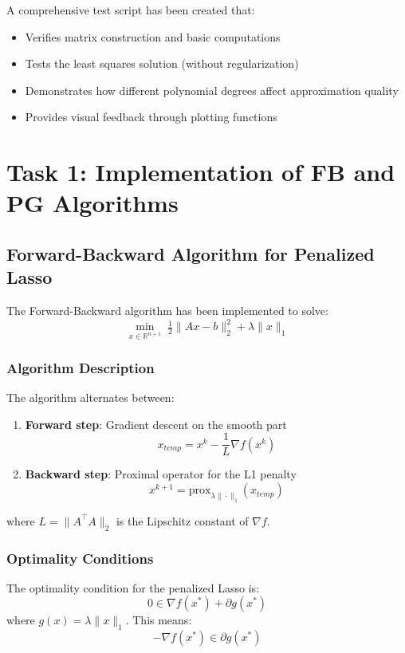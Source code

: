 \documentclass[11pt,a4paper]{article}
\begin{document}
A comprehensive test script has been created that:
\begin{itemize}
    \item Verifies matrix construction and basic computations
    \item Tests the least squares solution (without regularization)
    \item Demonstrates how different polynomial degrees affect approximation quality
    \item Provides visual feedback through plotting functions
\end{itemize}

\section{Task 1: Implementation of FB and PG Algorithms}

\subsection{Forward-Backward Algorithm for Penalized Lasso}

The Forward-Backward algorithm has been implemented to solve:
\begin{equation}
    \min_{x \in \mathbb{R}^{n+1}} \; \tfrac{1}{2}\|Ax - b\|_2^2 + \lambda \|x\|_1
\end{equation}

\subsubsection{Algorithm Description}

The algorithm alternates between:
\begin{enumerate}
    \item \textbf{Forward step}: Gradient descent on the smooth part
        \[ x_{temp} = x^k - \frac{1}{L}\nabla f(x^k) \]
    \item \textbf{Backward step}: Proximal operator for the L1 penalty
        \[ x^{k+1} = \text{prox}_{\lambda\|\cdot\|_1}(x_{temp}) \]
\end{enumerate}

where $L = \|A^\top A\|_2$ is the Lipschitz constant of $\nabla f$.

\subsubsection{Optimality Conditions}

The optimality condition for the penalized Lasso is:
\[ 0 \in \nabla f(x^*) + \partial g(x^*) \]
where $g(x) = \lambda\|x\|_1$. This means:
\[ -\nabla f(x^*) \in \partial g(x^*) \]
\end{document}
